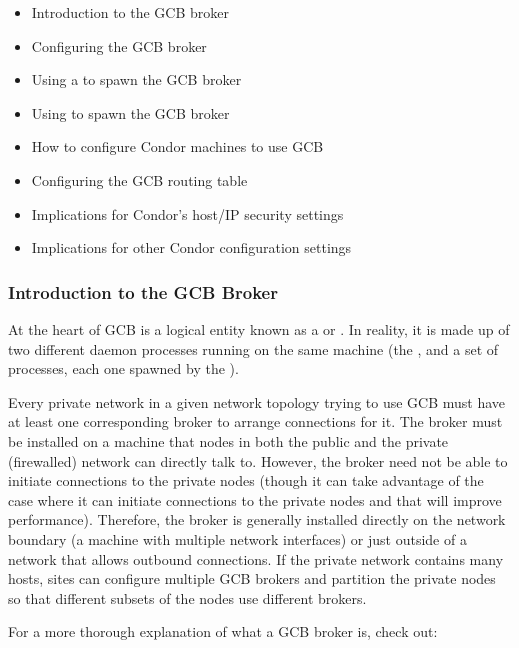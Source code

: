 \begin{itemize}
\item Introduction to the GCB broker
\item Configuring the GCB broker
\item Using a  to spawn the GCB broker
\item Using  to spawn the GCB broker
\item How to configure Condor machines to use GCB
\item Configuring the GCB routing table
\item Implications for Condor's host/IP security settings
\item Implications for other Condor configuration settings
\end{itemize}


\subsubsection{\label{sec:GCB-Broker-Intro}Introduction to the GCB Broker}

At the heart of GCB is a logical entity known as a  or
.
In reality, it is made up of two different daemon processes running on
the same machine (the , and a set of
 processes, each one spawned by the
).

Every private network in a given network topology trying to use GCB
must have at least one corresponding broker to arrange connections for
it.
The broker must be installed on a machine that nodes in both the
public and the private (firewalled) network can directly talk to.
However, the broker need not be able to initiate connections to the
private nodes (though it can take advantage of the case where it can
initiate connections to the private nodes and that will improve
performance). 
Therefore, the broker is generally installed directly on the network
boundary (a machine with multiple network interfaces) or just outside
of a network that allows outbound connections.
If the private network contains many hosts, sites can configure
multiple GCB brokers and partition the private nodes so that different
subsets of the nodes use different brokers.

For a more thorough explanation of what a GCB broker is, check out:

